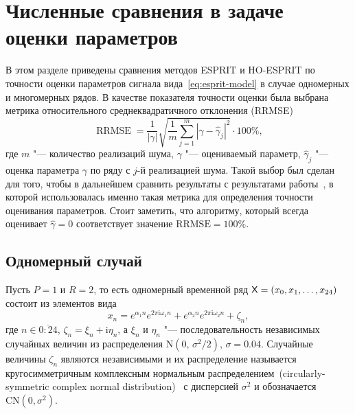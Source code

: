 \documentclass[specialist,
  substylefile=spbu_report.rtx,
subf,href,colorlinks=true, 12pt]{disser}
\theoremstyle{plain}
\theoremstyle{definition}
\theoremstyle{remark}
\newcommand{\iu}{\mathrm{i}}
\begin{document}
\section{Численные сравнения в задаче оценки
параметров}\label{sec:esprit-comparison}
В этом разделе приведены сравнения методов ESPRIT и HO-ESPRIT по
точности оценки параметров сигнала
вида~\eqref{eq:esprit-model} в случае одномерных и многомерных рядов.
В качестве показателя точности оценки была выбрана метрика
относительного среднеквадратичного
отклонения (RRMSE)
\begin{equation}
  \label{eq:rrmse}
  \operatorname{RRMSE} = \frac{1}{|\gamma|}\sqrt{\frac{1}{m}
  \sum_{j=1}^{m} \left|\gamma-\widehat{\gamma}_j\right|^2} \cdot 100\%,
\end{equation}
где $m$ "--- количество реализаций шума, $\gamma$ "--- оцениваемый
параметр, $\widehat{\gamma}_j$ "---
оценка параметра $\gamma$ по ряду с $j$-й реализацией шума.
Такой выбор был сделан для того, чтобы в дальнейшем сравнить
результаты с результатами
работы~\cite{hosvd-hooi-separation}, в которой использовалась именно
такая метрика для определения
точности оценивания параметров.
Стоит заметить, что алгоритму, который всегда оценивает
$\widehat{\gamma}=0$ соответствует значение $\text{RRMSE}=100\%$.

\subsection{Одномерный случай}\label{subsec:esprit-comparison}
Пусть $P=1$ и $R=2$, то есть одномерный временной ряд $\mathsf{X} =
\left(x_0, x_1, \ldots, x_{24}\right)$
состоит из элементов вида
\begin{equation}\label{eq:esprit-1d-series}
  x_n = e^{ \alpha_1 n }
  e^{2 \pi\iu \omega_1 n} +
  e^{ \alpha_2 n }
  e^{ 2 \pi \iu \omega_2 n} + \zeta_n,
\end{equation}
где $n \in \overline{0:24}$, $\zeta_n = \xi_n + \iu \eta_n$, а
$\xi_n$ и $\eta_n$ "--- последовательность независимых случайных величин из
распределения $\mathrm{N}(0,\, \sigma^2 / 2)$, $\sigma=0.04$.
Случайные величины $\zeta_n$ являются независимыми и их
распределение называется кругосимметричным комплексным нормальным
распределением~(circularly-symmetric complex normal
distribution)~\cite{ComplexNormal} с дисперсией
$\sigma^2$ и обозначается
$\mathrm{CN}(0, \sigma^2)$.
\end{document}

